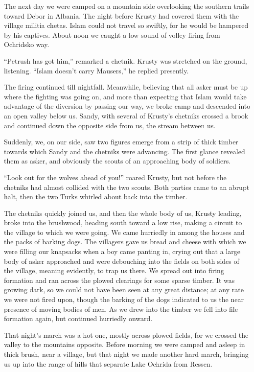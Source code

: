 \documentclass[a5paper,12pt]{book}
\begin{document}
The next day we were camped on a mountain side overlooking the southern trails toward Debor in Albania. The night before Krusty had covered them with the village militia chetas. Islam could not travel so swiftly, for he would be hampered by his captives. About noon we caught a low sound of volley firing from Ochridsko way.

“Petrush has got him,” remarked a chetnik. Krusty was stretched on the ground, listening. “Islam doesn't carry Mausers,” he replied presently.

The firing continued till nightfall. Meanwhile, believing that all asker must be up where the fighting was going on, and more than expecting that Islam would take advantage of the diversion by passing our way, we broke camp and descended into an open valley below us. Sandy, with several of Krusty’s chetniks crossed a brook and continued down the opposite side from us, the stream between us.

Suddenly, we, on our side, saw two figures emerge from a strip of thick timber towards which Sandy and the chetniks were advancing. The first glance revealed them as asker, and obviously the scouts of an approaching body of soldiers.

“Look out for the wolves ahead of you!” roared Krusty, but not before the chetniks had almost collided with the two scouts. Both parties came to an abrupt halt, then the two Turks whirled about back into the timber.

The chetniks quickly joined us, and then the whole body of us, Krusty leading, broke into the brushwood, heading south toward a low rise, making a circuit to the village to which we were going. We came hurriedly in among the houses and the packs of barking dogs. The villagers gave us bread and cheese with which we were filling our knapsacks when a boy came panting in, crying out that a large body of asker approached and were debouching into the fields on both sides of the village, meaning evidently, to trap us there. We spread out into firing formation and ran across the plowed clearings for some sparse timber. It was growing dark, so we could not have been seen at any great distance; at any rate we were not fired upon, though the barking of the dogs indicated to us the near presence of moving bodies of men. As we drew into the timber we fell into file formation again, but continued hurriedly onward.

That night’s march was a hot one, mostly across plowed fields, for we crossed the valley to the mountains opposite. Before morning we were camped and asleep in thick brush, near a village, but that night we made another hard march, bringing us up into the range of hills that separate Lake Ochrida from Ressen.
\end{document}
